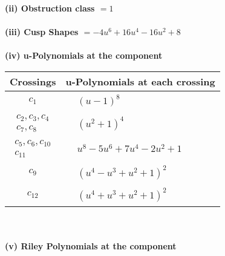 \documentclass[1p]{elsarticle_modified}
\theoremstyle{definition}
\begin{document}
\flushleft \textbf{(ii) Obstruction class $= 1$}\\~\\
\flushleft \textbf{(iii) Cusp Shapes $= -4 u^6+16 u^4-16 u^2+8$}\\~\\
\newpage\renewcommand{\arraystretch}{1}
\flushleft \textbf{(iv) u-Polynomials at the component}\newline \\
\begin{tabular}{m{50pt}|m{274pt}}
Crossings & \hspace{64pt}u-Polynomials at each crossing \\
\hline $$\begin{aligned}c_{1}\end{aligned}$$&$\begin{aligned}
&(u-1)^8
\end{aligned}$\\
\hline $$\begin{aligned}c_{2},c_{3},c_{4}\\c_{7},c_{8}\end{aligned}$$&$\begin{aligned}
&(u^2+1)^4
\end{aligned}$\\
\hline $$\begin{aligned}c_{5},c_{6},c_{10}\\c_{11}\end{aligned}$$&$\begin{aligned}
&u^8-5 u^6+7 u^4-2 u^2+1
\end{aligned}$\\
\hline $$\begin{aligned}c_{9}\end{aligned}$$&$\begin{aligned}
&(u^4- u^3+u^2+1)^2
\end{aligned}$\\
\hline $$\begin{aligned}c_{12}\end{aligned}$$&$\begin{aligned}
&(u^4+u^3+u^2+1)^2
\end{aligned}$\\
\hline
\end{tabular}\\~\\
\newpage\renewcommand{\arraystretch}{1}
\flushleft \textbf{(v) Riley Polynomials at the component}\newline \\
\end{document}
